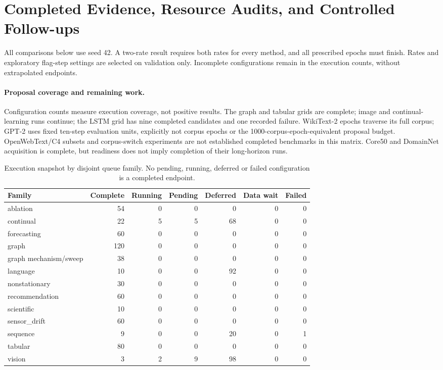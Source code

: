 \section{Completed Evidence, Resource Audits, and Controlled Follow-ups}\label{app:evidence-extension}
All comparisons below use seed 42. A two-rate result requires both rates for every method, and all prescribed epochs must finish. Rates and exploratory flag-step settings are selected on validation only. Incomplete configurations remain in the execution counts, without extrapolated endpoints.
\paragraph{Proposal coverage and remaining work.} Configuration counts measure execution coverage, not positive results. The graph and tabular grids are complete; image and continual-learning runs continue; the LSTM grid has nine completed candidates and one recorded failure. WikiText-2 epochs traverse its full corpus; GPT-2 uses fixed ten-step evaluation units, explicitly not corpus epochs or the 1000-corpus-epoch-equivalent proposal budget. OpenWebText/C4 subsets and corpus-switch experiments are not established completed benchmarks in this matrix. Core50 and DomainNet acquisition is complete, but readiness does not imply completion of their long-horizon runs.
\begin{table}[htbp]\centering\footnotesize\setlength{\tabcolsep}{3pt}\caption{Execution snapshot by disjoint queue family. No pending, running, deferred or failed configuration is a completed endpoint.}\label{tab:evidence-coverage}\begin{adjustbox}{max width=\linewidth}
\begin{tabular}{lrrrrrr}\toprule Family & Complete & Running & Pending & Deferred & Data wait & Failed\\\midrule
ablation & 54 & 0 & 0 & 0 & 0 & 0 \\
continual & 22 & 5 & 5 & 68 & 0 & 0 \\
forecasting & 60 & 0 & 0 & 0 & 0 & 0 \\
graph & 120 & 0 & 0 & 0 & 0 & 0 \\
graph mechanism/sweep & 38 & 0 & 0 & 0 & 0 & 0 \\
language & 10 & 0 & 0 & 92 & 0 & 0 \\
nonstationary & 30 & 0 & 0 & 0 & 0 & 0 \\
recommendation & 60 & 0 & 0 & 0 & 0 & 0 \\
scientific & 10 & 0 & 0 & 0 & 0 & 0 \\
sensor\_drift & 60 & 0 & 0 & 0 & 0 & 0 \\
sequence & 9 & 0 & 0 & 20 & 0 & 1 \\
tabular & 80 & 0 & 0 & 0 & 0 & 0 \\
vision & 3 & 2 & 9 & 98 & 0 & 0 \\
\bottomrule\end{tabular}
\end{adjustbox}\end{table}

